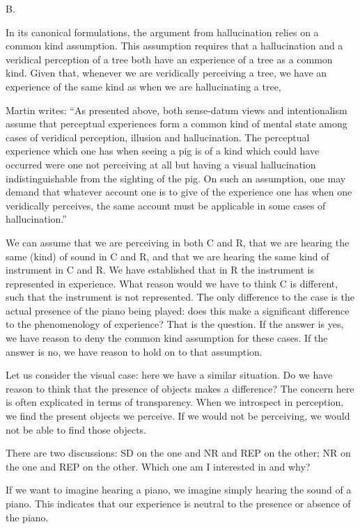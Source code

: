 \documentclass[sloppy, journal, git, bytitle, dodraft]{humapap}
\begin{document}
B. 



In its canonical formulations, the argument from hallucination relies on a common kind assumption. This assumption requires that a hallucination and a veridical perception of a tree both have an experience of a tree as a common kind. Given that, whenever we are veridically perceiving a tree, we have an experience of the same kind as when we are hallucinating a tree,

Martin writes: ``As presented above, both sense-datum views and intentionalism assume that perceptual experiences form a common kind of mental state among cases of veridical perception, illusion and hallucination. The perceptual experience which one has when seeing a pig is of a kind which could have occurred were one not perceiving at all but having a visual hallucination indistinguishable from the sighting of the pig. On such an assumption, one may demand that whatever account one is to give of the experience one has when one veridically perceives, the same account must be applicable in some cases of hallucination.''

We can assume that we are perceiving in both C and R, that we are hearing the same (kind) of sound in C and R, and that we are hearing the same kind of instrument in C and R. We have established that in R the instrument is represented in experience. What reason would we have to think C is different, such that the instrument is not represented. The only difference to the case is the actual presence of the piano being played: does this make a significant difference to the phenomenology of experience? That is the question. If the answer is yes, we have reason to deny the common kind assumption for these cases. If the answer is no, we have reason to hold on to that assumption. 

Let us consider the visual case: here we have a similar situation. Do we have reason to think that the presence of objects makes a difference? The concern here is often explicated in terms of transparency. When we introspect in perception, we find the present objects we perceive. If we would not be perceiving, we would not be able to find those objects.

There are two discussions: SD on the one and NR and REP on the other; NR on the one and REP on the other. Which one am I interested in and why? 

If we want to imagine hearing a piano, we imagine simply hearing the sound of a piano. This indicates that our experience is neutral to the presence or absence of the piano. 
\end{document}
